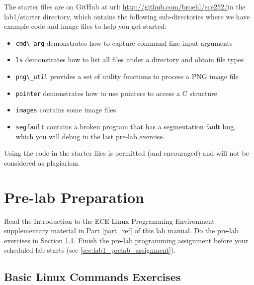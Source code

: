 The starter files are on GitHub at url: \url{http://github.com/broehl/ece252/}in the lab1/starter directory, which ontains the following sub-directories where we have example code and image files to help you get started:
\begin{itemize}
    \item \verb+cmd\_arg+ demonstrates how to capture command line input arguments
    \item \verb+ls+ demonstrates how to list all files under a directory and obtain file types
    \item \verb+png\_util+ provides a set of utility functions to process a PNG image file
    \item \verb+pointer+ demonstrates how to use pointers to access a C structure
    \item \verb+images+ contains some image files
    \item \verb+segfault+ contains a broken program that has a segmentation fault bug, which you will debug in the last pre-lab exercise.
\end{itemize}
Using the code in the starter files is permitted (and encouraged) and will not be considered as plagiarism.

\section{Pre-lab Preparation}

Read the Introduction to the ECE Linux Programming Environment supplementary material in Part \ref{part_ref} of this lab manual. Do the pre-lab exercises in Section \ref{sec_ex1}. Finish the pre-lab programming assignment before your scheduled lab starts (see \ref{sec:lab1_prelab_assignment}).
\subsection{Basic Linux Commands Exercises}
\label{sec_ex1}


